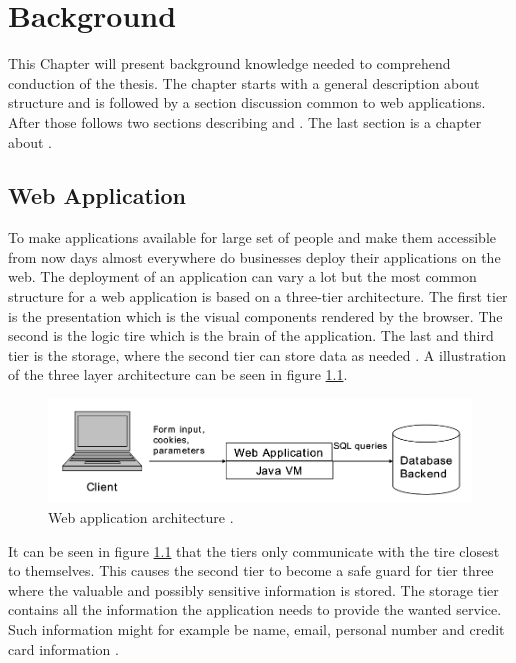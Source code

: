 \chapter{Background}
This Chapter will present background knowledge needed to comprehend conduction of the thesis. The chapter starts with a general description about \textit{} structure and is followed by a section discussion common \textit{} to web applications. After those follows two sections describing \textit{} and \textit{}. The last section is a chapter about \textit{}.


\section{Web Application}
\label{WebApplication}
To make applications available for large set of people and make them accessible from now days almost everywhere do businesses deploy their applications on the web. The deployment of an application can vary a lot but the most common structure for a web application is based on a three-tier architecture. The first tier is the presentation which is the visual components rendered by the browser. The second is the logic tire which is the brain of the application. The last and third tier is the storage, where the second tier can store data as needed \parencite{JustinClarke-Salt2009SIAa}. A illustration of the three layer architecture can be seen in figure \ref{fig:webApplication-Haldar}.

\begin{figure}
  \centering
  \includegraphics[width=\textwidth]{images/webApplication-Haldar.png}
  \caption{Web application architecture \cite{Haldar}.}
  \label{fig:webApplication-Haldar}
\end{figure}

It can be seen in figure \ref{fig:webApplication-Haldar} that the tiers only communicate with the tire closest to themselves. This causes the second tier to become a safe guard for tier three where the valuable and possibly sensitive information is stored. The storage tier contains all the information the application needs to provide the wanted service. Such information might for example be name, email, personal number and credit card information \parencite{JustinClarke-Salt2009SIAa}.

